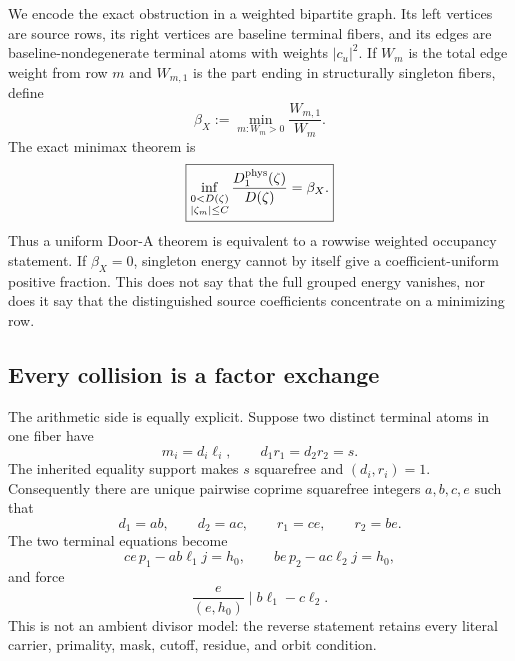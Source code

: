 We encode the exact obstruction in a weighted bipartite graph.  Its left
vertices are source rows, its right vertices are baseline terminal fibers,
and its edges are baseline-nondegenerate terminal atoms with weights
\(|c_u|^2\).  If \(W_m\) is the total edge weight from row \(m\) and
\(W_{m,1}\) is the part ending in structurally singleton fibers, define
\begin{equation}
 \beta_X
 :=\min_{m:W_m>0}\frac{W_{m,1}}{W_m}.
 \label{eq:tpc57-intro-beta}
\end{equation}
The exact minimax theorem is
\begin{equation}
 \boxed{
 \inf_{\substack{0<D(\zeta)\\|\zeta_m|\le C}}
 \frac{D_1^{\rm phys}(\zeta)}{D(\zeta)}
 =\beta_X.}
 \label{eq:tpc57-intro-minimax}
\end{equation}
Thus a uniform Door-A theorem is equivalent to a rowwise weighted
occupancy statement.  If \(\beta_X=0\), singleton energy cannot by itself
give a coefficient-uniform positive fraction.  This does not say that the
full grouped energy vanishes, nor does it say that the distinguished source
coefficients concentrate on a minimizing row.

\subsection{Every collision is a factor exchange}

The arithmetic side is equally explicit.  Suppose two distinct terminal
atoms in one fiber have
\begin{equation}
 m_i=d_i\ell_i,
 \qquad
 d_1r_1=d_2r_2=s.
 \label{eq:tpc57-intro-collision-data}
\end{equation}
The inherited equality support makes \(s\) squarefree and
\((d_i,r_i)=1\).  Consequently there are unique pairwise coprime
squarefree integers \(a,b,c,e\) such that
\begin{equation}
 d_1=ab,
 \qquad d_2=ac,
 \qquad r_1=ce,
 \qquad r_2=be.
 \label{eq:tpc57-intro-factor-exchange}
\end{equation}
The two terminal equations become
\begin{equation}
 ce\,p_1-ab\ell_1j=h_0,
 \qquad
 be\,p_2-ac\ell_2j=h_0,
 \label{eq:tpc57-intro-exchange-equations}
\end{equation}
and force
\begin{equation}
 \boxed{
 \frac{e}{(e,h_0)}\mid b\ell_1-c\ell_2.}
 \label{eq:tpc57-intro-exchange-divisibility}
\end{equation}
This is not an ambient divisor model: the reverse statement retains every
literal carrier, primality, mask, cutoff, residue, and orbit condition.

